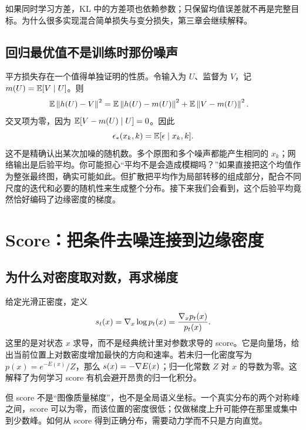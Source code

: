 如果同时学习方差，KL 中的方差项也依赖参数；只保留均值误差就不再是完整目标。为什么很多实现混合简单损失与变分损失，第三章会继续解释。

\subsection{回归最优值不是训练时那份噪声}
平方损失存在一个值得单独证明的性质。令输入为 $U$、监督为 $V$，记 $m(U)=\mathbb{E}[V\mid U]$。则
\begin{align}
 \mathbb{E}\left\lVert h(U)-V\right\rVert^2
 &=\mathbb{E}\left\lVert h(U)-m(U)\right\rVert^2+\mathbb{E}\left\lVert V-m(U)\right\rVert^2.
 \label{eq:conditional-projection}
\end{align}
交叉项为零，因为 $\mathbb{E}[V-m(U)\mid U]=0$。因此
\begin{equation}
 \epsilon_*(x_k,k)=\mathbb{E}[\epsilon\mid x_k,k].
\end{equation}
这不是精确认出某次加噪的随机数。多个原图和多个噪声都能产生相同的 $x_k$；网络输出是后验平均。你可能担心“平均不是会造成模糊吗？”如果直接把这个均值作为整张最终图，确实可能如此。但扩散把平均作为局部转移的组成部分，配合不同尺度的迭代和必要的随机性来生成整个分布。接下来我们会看到，这个后验平均竟然恰好编码了边缘密度的梯度。

\section{Score：把条件去噪连接到边缘密度}\label{sec:score}
\subsection{为什么对密度取对数，再求梯度}
给定光滑正密度，定义
\begin{equation}
 s_t(x)=\nabla_x\log p_t(x)=\frac{\nabla_xp_t(x)}{p_t(x)}.
\end{equation}
这里的是对状态 $x$ 求导，而不是经典统计里对参数求导的 score。它是向量场，给出当前位置上对数密度增加最快的方向和速率。若未归一化密度写为 $p(x)=e^{-E(x)}/Z$，那么 $s(x)=-\nabla E(x)$；归一化常数 $Z$ 对 $x$ 的导数为零。这解释了为何学习 score 有机会避开昂贵的归一化积分。

但 score 不是“图像质量梯度”，也不是全局语义坐标。一个真实分布的两个对称峰之间，score 可以为零，而该位置的密度很低；仅做梯度上升可能停在那里或集中到少数峰。如何从 score 得到正确分布，需要动力学而不只是方向直觉。


